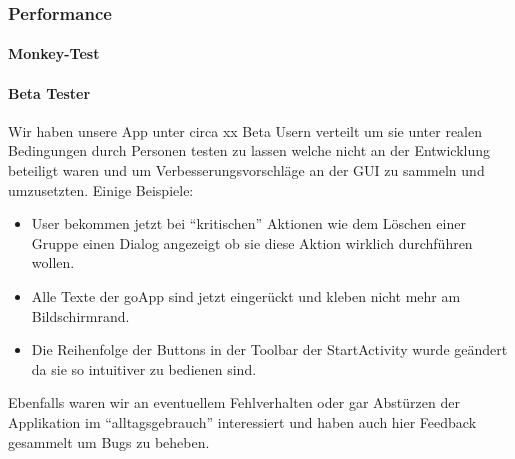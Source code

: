 \documentclass{scrartcl}
\begin{document}
	\subsubsection{Performance}
		\paragraph{Monkey-Test}
		\paragraph{Beta Tester}
		Wir haben unsere App unter circa xx Beta Usern verteilt um sie unter realen Bedingungen durch Personen testen zu lassen welche nicht an der Entwicklung beteiligt waren und um Verbesserungsvorschläge an der GUI zu sammeln und umzusetzten.
		\newline Einige Beispiele:
			\begin{itemize}
				\item User bekommen jetzt bei "`kritischen"' Aktionen wie dem Löschen einer Gruppe einen Dialog angezeigt ob sie diese Aktion wirklich durchführen wollen.
				\item Alle Texte der goApp sind jetzt eingerückt und kleben nicht mehr am Bildschirmrand.
				\item Die Reihenfolge der Buttons in der Toolbar der StartActivity wurde geändert da sie so intuitiver zu bedienen sind.
			\end{itemize}
		
		Ebenfalls waren wir an eventuellem Fehlverhalten oder gar Abstürzen der Applikation im "`alltagsgebrauch"' interessiert und haben auch hier Feedback gesammelt um Bugs zu beheben.
\end{document}
